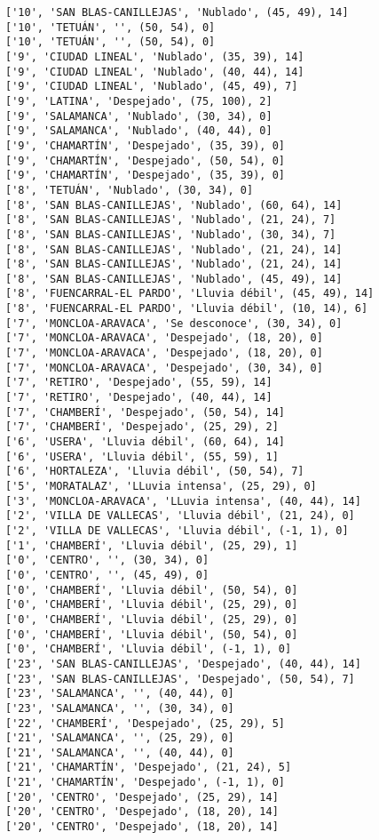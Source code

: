 \documentclass[11pt]{article}
\begin{document}
\begin{Verbatim}[commandchars=\\\{\}]
['10', 'SAN BLAS-CANILLEJAS', 'Nublado', (45, 49), 14]
['10', 'TETUÁN', '', (50, 54), 0]
['10', 'TETUÁN', '', (50, 54), 0]
['9', 'CIUDAD LINEAL', 'Nublado', (35, 39), 14]
['9', 'CIUDAD LINEAL', 'Nublado', (40, 44), 14]
['9', 'CIUDAD LINEAL', 'Nublado', (45, 49), 7]
['9', 'LATINA', 'Despejado', (75, 100), 2]
['9', 'SALAMANCA', 'Nublado', (30, 34), 0]
['9', 'SALAMANCA', 'Nublado', (40, 44), 0]
['9', 'CHAMARTÍN', 'Despejado', (35, 39), 0]
['9', 'CHAMARTÍN', 'Despejado', (50, 54), 0]
['9', 'CHAMARTÍN', 'Despejado', (35, 39), 0]
['8', 'TETUÁN', 'Nublado', (30, 34), 0]
['8', 'SAN BLAS-CANILLEJAS', 'Nublado', (60, 64), 14]
['8', 'SAN BLAS-CANILLEJAS', 'Nublado', (21, 24), 7]
['8', 'SAN BLAS-CANILLEJAS', 'Nublado', (30, 34), 7]
['8', 'SAN BLAS-CANILLEJAS', 'Nublado', (21, 24), 14]
['8', 'SAN BLAS-CANILLEJAS', 'Nublado', (21, 24), 14]
['8', 'SAN BLAS-CANILLEJAS', 'Nublado', (45, 49), 14]
['8', 'FUENCARRAL-EL PARDO', 'Lluvia débil', (45, 49), 14]
['8', 'FUENCARRAL-EL PARDO', 'Lluvia débil', (10, 14), 6]
['7', 'MONCLOA-ARAVACA', 'Se desconoce', (30, 34), 0]
['7', 'MONCLOA-ARAVACA', 'Despejado', (18, 20), 0]
['7', 'MONCLOA-ARAVACA', 'Despejado', (18, 20), 0]
['7', 'MONCLOA-ARAVACA', 'Despejado', (30, 34), 0]
['7', 'RETIRO', 'Despejado', (55, 59), 14]
['7', 'RETIRO', 'Despejado', (40, 44), 14]
['7', 'CHAMBERÍ', 'Despejado', (50, 54), 14]
['7', 'CHAMBERÍ', 'Despejado', (25, 29), 2]
['6', 'USERA', 'Lluvia débil', (60, 64), 14]
['6', 'USERA', 'Lluvia débil', (55, 59), 1]
['6', 'HORTALEZA', 'Lluvia débil', (50, 54), 7]
['5', 'MORATALAZ', 'LLuvia intensa', (25, 29), 0]
['3', 'MONCLOA-ARAVACA', 'LLuvia intensa', (40, 44), 14]
['2', 'VILLA DE VALLECAS', 'Lluvia débil', (21, 24), 0]
['2', 'VILLA DE VALLECAS', 'Lluvia débil', (-1, 1), 0]
['1', 'CHAMBERÍ', 'Lluvia débil', (25, 29), 1]
['0', 'CENTRO', '', (30, 34), 0]
['0', 'CENTRO', '', (45, 49), 0]
['0', 'CHAMBERÍ', 'Lluvia débil', (50, 54), 0]
['0', 'CHAMBERÍ', 'Lluvia débil', (25, 29), 0]
['0', 'CHAMBERÍ', 'Lluvia débil', (25, 29), 0]
['0', 'CHAMBERÍ', 'Lluvia débil', (50, 54), 0]
['0', 'CHAMBERÍ', 'Lluvia débil', (-1, 1), 0]
['23', 'SAN BLAS-CANILLEJAS', 'Despejado', (40, 44), 14]
['23', 'SAN BLAS-CANILLEJAS', 'Despejado', (50, 54), 7]
['23', 'SALAMANCA', '', (40, 44), 0]
['23', 'SALAMANCA', '', (30, 34), 0]
['22', 'CHAMBERÍ', 'Despejado', (25, 29), 5]
['21', 'SALAMANCA', '', (25, 29), 0]
['21', 'SALAMANCA', '', (40, 44), 0]
['21', 'CHAMARTÍN', 'Despejado', (21, 24), 5]
['21', 'CHAMARTÍN', 'Despejado', (-1, 1), 0]
['20', 'CENTRO', 'Despejado', (25, 29), 14]
['20', 'CENTRO', 'Despejado', (18, 20), 14]
['20', 'CENTRO', 'Despejado', (18, 20), 14]

\end{Verbatim}
\end{document}
